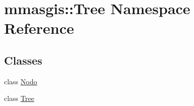 \hypertarget{namespacemmasgis_1_1Tree}{
\section{mmasgis::Tree Namespace Reference}
\label{namespacemmasgis_1_1Tree}
}
\subsection*{Classes}
\begin{DoxyCompactItemize}
\item 
class \hyperlink{classmmasgis_1_1Tree_1_1Nodo}{Nodo}
\item 
class \hyperlink{classmmasgis_1_1Tree_1_1Tree}{Tree}
\end{DoxyCompactItemize}

